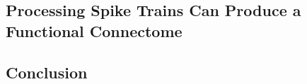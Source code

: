 \documentclass[11pt]{article}
\newcommand{\subsectionwithindent}[1]{
    \subsection*{#1}
    \hspace{\parindent} %
}
\begin{document}
\subsectionwithindent{Processing Spike Trains Can Produce a Functional Connectome} %


\subsectionwithindent{Conclusion} %

\newpage
\printbibliography
\end{document}
